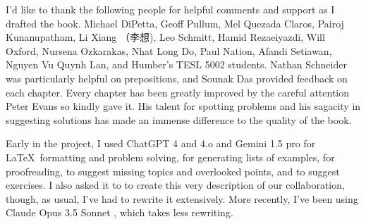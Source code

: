 \addchap{\lsAcknowledgementTitle} 

I'd like to thank the following people for helpful comments and support as I drafted the book. Michael DiPetta, Geoff Pullum, Mel Quezada Claros, Pairoj Kunanupatham, Li Xiang （李想), Leo Schmitt, Hamid Rezaeiyazdi, Will Oxford, Nursena Ozkarakas, Nhat Long Do, Paul Nation, Afandi Setiawan, Nguyen Vu Quynh Lan, and Humber's TESL 5002 students. Nathan Schneider was particularly helpful on prepositions, and Sounak Das provided feedback on each chapter. Every chapter has been greatly improved by the careful attention Peter Evans so kindly gave it. His talent for spotting problems and his sagacity in suggesting solutions has made an immense difference to the quality of the book.

Early in the project, I used ChatGPT 4 and 4.o \citep{openai2023gpt4} and Gemini 1.5 pro \citep{deepmind2023gemini} for \LaTeX ~formatting and problem solving, for generating lists of examples, for proofreading, to suggest missing topics and overlooked points, and to suggest exercises. I also asked it to to create this very description of our collaboration, though, as usual, I've had to rewrite it extensively. More recently, I've been using Claude Opus 3.5 Sonnet \citep{Anthropic2024}, which takes less rewriting.

